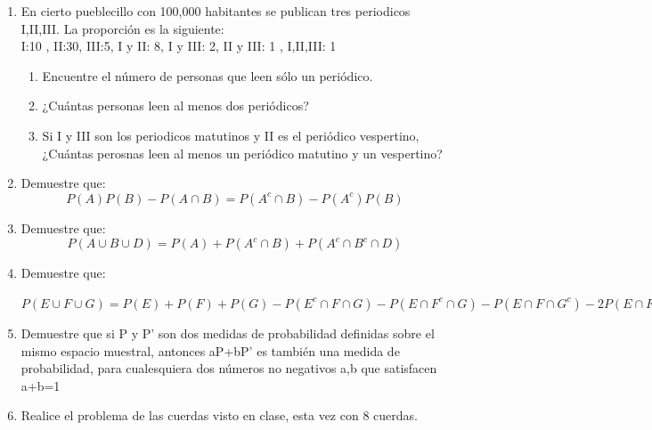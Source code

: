 \documentclass[12pt,a4paper]{report}
\begin{document}
\begin{enumerate}
   \item {
    En cierto pueblecillo con 100,000 habitantes se publican tres periodicos I,II,III. La proporción es la siguiente:\\
I:10 , II:30, III:5, I y II: 8, I y III: 2, II y III: 1 , I,II,III: 1
	\begin{enumerate}[label=\alph*) ]
   \item {
   Encuentre el número de personas que leen sólo un periódico.\\

   }

   \item {
   ¿Cuántas personas leen al menos dos periódicos?\\

   }

   \item {
  Si I y III son los periodicos matutinos y II es el periódico vespertino, ¿Cuántas perosnas leen al menos un periódico matutino y un vespertino?\\

   }

	\end{enumerate}

    }

   \item {
    Demuestre que:\\
	$$P(A)P(B)-P(A \cap B)=P(A^c \cap B )- P(A^c)P(B)$$
	}

   \item {
    Demuestre que:\\
	$$P(A \cup B \cup D) = P(A)+P(A^c \cap B) +P(A^c \cap B^c \cap D)$$
	}

   \item {
    Demuestre que:\\
	\begin{center}
	$P(E \cup F \cup G) = P(E) + P(F) + P(G) - P(E^c \cap F \cap G) -P(E \cap F^c \cap G) - P(E \cap F \cap G^c)-2P(E \cap F \cap G)$
	\end{center}
	}

   \item {
    Demuestre que si P y P' son dos medidas de probabilidad definidas sobre el mismo espacio muestral, antonces aP+bP' es también una medida de probabilidad, para cualesquiera dos números no negativos a,b que satisfacen a+b=1\\
	}

   \item {
    Realice el problema de las cuerdas visto en clase, esta vez con 8 cuerdas.\\
	}



\end{enumerate}
\end{document}
